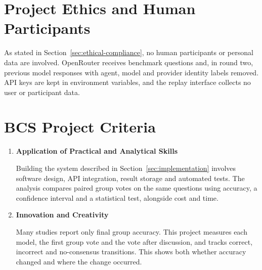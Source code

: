 \documentclass[12pt,a4paper]{article}
\begin{document}
\begin{center}
{%
    }
    
    \label{fig:mockup}
\end{center}

\section{Project Ethics and Human Participants}
\label{sec:ethics}

As stated in Section~\ref{sec:ethical-compliance}, no human participants or
personal data are involved. OpenRouter receives benchmark questions and, in
round two, previous model responses with agent, model and provider identity
labels removed. API keys are kept in environment variables, and the replay
interface collects no user or participant data.

\section{BCS Project Criteria}
\label{sec:bcs}

\begin{enumerate}

    \item \textbf{Application of Practical and Analytical Skills}

    Building the system described in Section~\ref{sec:implementation} involves
    software design, API integration, result storage and automated tests. The
    analysis compares paired group votes on the same questions using accuracy,
    a confidence interval and a statistical test, alongside cost and time.

    \item \textbf{Innovation and Creativity}

    Many studies report only final group accuracy. This project measures each
    model, the first group vote and the vote after discussion, and tracks
    correct, incorrect and no-consensus transitions. This shows both whether
    accuracy changed and where the change occurred.

\end{enumerate}
\end{document}
